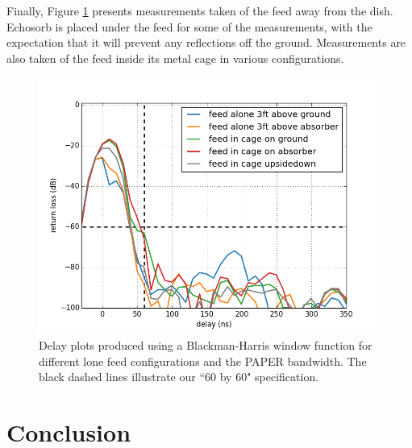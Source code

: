 \documentclass[12pt,preprint]{aastex}
\begin{document}
Finally, Figure \ref{fig:outofthedish} presents measurements taken of the feed away from the dish. Echosorb is placed under the feed for some of the measurements, with the expectation that it will prevent any reflections off the ground. Measurements are also taken of the feed inside its metal cage in various configurations. 

\begin{figure}
\centering
\includegraphics[totalheight=0.5\textheight]{plots/delay_feed.png}
\caption{Delay plots produced using a Blackman-Harris window function for different lone feed configurations and the PAPER bandwidth. The black dashed lines illustrate our ``60 by 60" specification.}
\label{fig:outofthedish}
\end{figure}


\section{Conclusion}
\end{document}
